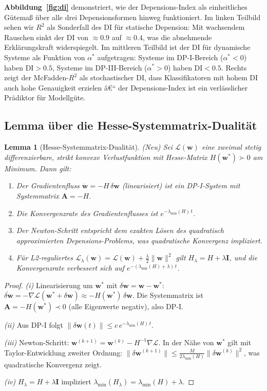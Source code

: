 ﻿\documentclass[12pt, a4paper]{article}
\newtheorem{lemma}[theorem]{Lemma}
\theoremstyle{definition}
\theoremstyle{remark}
\newcommand{\vw}{\bm{w}}
\newcommand{\vA}{\bm{A}}
\newcommand{\vI}{\bm{I}}
\newcommand{\DI}{\mathrm{DI}}
\begin{document}
\textbf{Abbildung~\ref{fig:di}} demonstriert, wie der Depensions-Index als
einheitliches Gütemaß über alle drei Depensionsformen hinweg funktioniert. Im linken
Teilbild sehen wir $R^2$ als Sonderfall des DI für statische Depension: Mit wachsendem
Rauschen sinkt der DI von $\approx 0.9$ auf $\approx 0.4$, was die abnehmende
Erklärungskraft widerspiegelt. Im mittleren Teilbild ist der DI für dynamische Systeme
als Funktion von $\alpha^*$ aufgetragen: Systeme im DP-I-Bereich ($\alpha^* < 0$) haben
$\DI > 0.5$, Systeme im DP-III-Bereich ($\alpha^* > 0$) haben $\DI < 0.5$. Rechts
zeigt der McFadden-$R^2$ als stochastischer DI, dass Klassifikatoren mit hohem DI
auch hohe Genauigkeit erzielen â€“ der Depensions-Index ist ein verlässlicher Prädiktor
für Modellgüte.

\subsection{Lemma über die Hesse-Systemmatrix-Dualität}

\begin{lemma}[Hesse-Systemmatrix-Dualität]
\label{lem:hesse_system}
\textup{(Neu)} Sei $\mathcal{L}(\vw)$ eine zweimal stetig differenzierbare,
strikt konvexe Verlustfunktion mit Hesse-Matrix $H(\vw^*) \succ 0$ am Minimum.
Dann gilt:
\begin{enumerate}[label=(\roman*)]
  \item Der Gradientenfluss $\dot{\vw} = -H\,\delta\vw$ (linearisiert) ist ein
    DP-I-System mit Systemmatrix $\vA = -H$.
  \item Die Konvergenzrate des Gradientenflusses ist $e^{-\lambda_{\min}(H)\, t}$.
  \item Der Newton-Schritt entspricht dem exakten Lösen des quadratisch approximierten
    Depensions-Problems, was quadratische Konvergenz impliziert.
  \item Für L2-reguliertes $\mathcal{L}_\lambda(\vw) = \mathcal{L}(\vw) + \frac\lambda2\|\vw\|^2$
    gilt $H_\lambda = H + \lambda \vI$, und die Konvergenzrate verbessert sich auf
    $e^{-(\lambda_{\min}(H) + \lambda)\,t}$.
\end{enumerate}
\end{lemma}

\begin{proof}
  \textit{(i)} Linearisierung um $\vw^*$ mit $\delta\vw = \vw - \vw^*$:
  $\dot{\delta\vw} = -\nabla\mathcal{L}(\vw^* + \delta\vw) \approx -H(\vw^*)\,\delta\vw$.
  Die Systemmatrix ist $\vA = -H(\vw^*) \prec 0$ (alle Eigenwerte negativ), also DP-I.

  \textit{(ii)} Aus DP-I folgt $\|\delta\vw(t)\| \leq c\,e^{-\lambda_{\min}(H)\,t}$.

  \textit{(iii)} Newton-Schritt: $\vw^{(k+1)} = \vw^{(k)} - H^{-1}\nabla\mathcal{L}$.
  In der Nähe von $\vw^*$ gilt mit Taylor-Entwicklung zweiter Ordnung:
  $\|\delta\vw^{(k+1)}\| \leq \frac{M}{2\lambda_{\min}(H)}\|\delta\vw^{(k)}\|^2$,
  was quadratische Konvergenz zeigt.

  \textit{(iv)} $H_\lambda = H + \lambda\vI$ impliziert
  $\lambda_{\min}(H_\lambda) = \lambda_{\min}(H) + \lambda$. \qedhere
\end{proof}
\end{document}
